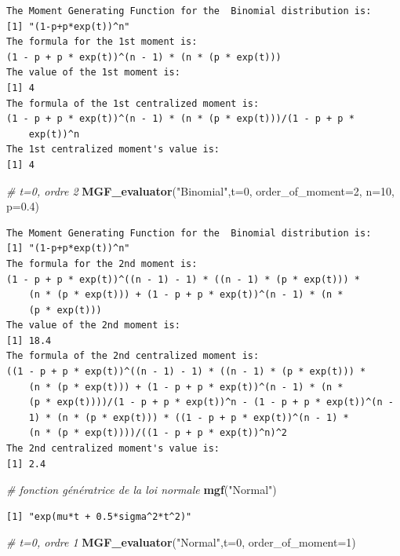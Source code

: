 \documentclass[
]{book}
\newenvironment{Shaded}{\begin{snugshade}}{\end{snugshade}}
\newcommand{\CommentTok}[1]{\textcolor[rgb]{0.56,0.35,0.01}{\textit{#1}}}
\newcommand{\DataTypeTok}[1]{\textcolor[rgb]{0.13,0.29,0.53}{#1}}
\newcommand{\DecValTok}[1]{\textcolor[rgb]{0.00,0.00,0.81}{#1}}
\newcommand{\FloatTok}[1]{\textcolor[rgb]{0.00,0.00,0.81}{#1}}
\newcommand{\KeywordTok}[1]{\textcolor[rgb]{0.13,0.29,0.53}{\textbf{#1}}}
\newcommand{\NormalTok}[1]{#1}
\newcommand{\StringTok}[1]{\textcolor[rgb]{0.31,0.60,0.02}{#1}}
\theoremstyle{definition}
\theoremstyle{definition}
\theoremstyle{definition}
\theoremstyle{remark}
\begin{document}
\begin{verbatim}
The Moment Generating Function for the  Binomial distribution is: 
[1] "(1-p+p*exp(t))^n"
The formula for the 1st moment is: 
(1 - p + p * exp(t))^(n - 1) * (n * (p * exp(t)))
The value of the 1st moment is: 
[1] 4
The formula of the 1st centralized moment is: 
(1 - p + p * exp(t))^(n - 1) * (n * (p * exp(t)))/(1 - p + p * 
    exp(t))^n
The 1st centralized moment's value is: 
[1] 4
\end{verbatim}

\begin{Shaded}
\begin{Highlighting}[]
\CommentTok{# t=0, ordre 2}
\KeywordTok{MGF_evaluator}\NormalTok{(}\StringTok{"Binomial"}\NormalTok{,}\DataTypeTok{t=}\DecValTok{0}\NormalTok{, }\DataTypeTok{order_of_moment=}\DecValTok{2}\NormalTok{, }\DataTypeTok{n=}\DecValTok{10}\NormalTok{, }\DataTypeTok{p=}\FloatTok{0.4}\NormalTok{)}
\end{Highlighting}
\end{Shaded}

\begin{verbatim}
The Moment Generating Function for the  Binomial distribution is: 
[1] "(1-p+p*exp(t))^n"
The formula for the 2nd moment is: 
(1 - p + p * exp(t))^((n - 1) - 1) * ((n - 1) * (p * exp(t))) * 
    (n * (p * exp(t))) + (1 - p + p * exp(t))^(n - 1) * (n * 
    (p * exp(t)))
The value of the 2nd moment is: 
[1] 18.4
The formula of the 2nd centralized moment is: 
((1 - p + p * exp(t))^((n - 1) - 1) * ((n - 1) * (p * exp(t))) * 
    (n * (p * exp(t))) + (1 - p + p * exp(t))^(n - 1) * (n * 
    (p * exp(t))))/(1 - p + p * exp(t))^n - (1 - p + p * exp(t))^(n - 
    1) * (n * (p * exp(t))) * ((1 - p + p * exp(t))^(n - 1) * 
    (n * (p * exp(t))))/((1 - p + p * exp(t))^n)^2
The 2nd centralized moment's value is: 
[1] 2.4
\end{verbatim}

\begin{Shaded}
\begin{Highlighting}[]
\CommentTok{# fonction génératrice de la loi normale}
\KeywordTok{mgf}\NormalTok{(}\StringTok{"Normal"}\NormalTok{)}
\end{Highlighting}
\end{Shaded}

\begin{verbatim}
[1] "exp(mu*t + 0.5*sigma^2*t^2)"
\end{verbatim}

\begin{Shaded}
\begin{Highlighting}[]
\CommentTok{# t=0, ordre 1}
\KeywordTok{MGF_evaluator}\NormalTok{(}\StringTok{"Normal"}\NormalTok{,}\DataTypeTok{t=}\DecValTok{0}\NormalTok{, }\DataTypeTok{order_of_moment=}\DecValTok{1}\NormalTok{)}
\end{Highlighting}
\end{Shaded}
\end{document}
